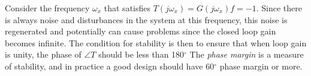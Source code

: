 Consider the frequency $\omega_x$ that satisfies $ T(j\omega_x) = G(j{\omega _x})f =  - 1$. Since there is always noise and disturbances in the system at this frequency, this noise is regenerated and potentially can cause problems since the closed loop gain becomes infinite. The condition for stability is then to ensure that when loop gain is unity, the phase of $\angle T$ should be less than 180$^\circ$  The \textit{phase margin} is a measure of stability, and in practice a good design should have 60$^\circ$ phase margin or more.
%
%
